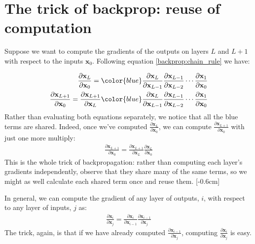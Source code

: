 \section{The trick of backprop: reuse of computation}
Suppose we want to compute the gradients of the outputs on layers $L$ and $L+1$ with respect to the inputs $\mathbf{x}_0$. Following equation \ref{backprop:chain_rule} we have:

\begin{align}
    \frac{\partial \mathbf{x}_{L}}{\partial \mathbf{x}_{0}} =  \color{blue} \frac{\partial \mathbf{x}_{L}}{\partial \mathbf{x}_{L-1}}\frac{\partial \mathbf{x}_{L-1}}{\partial \mathbf{x}_{L-2}} \cdots \frac{\partial \mathbf{x}_{1}}{\partial \mathbf{x}_{0}}\\
    \frac{\partial \mathbf{x}_{L+1}}{\partial \mathbf{x}_{0}} = \frac{\partial \mathbf{x}_{L+1}}{\partial \mathbf{x}_{L}} \color{blue} \frac{\partial \mathbf{x}_{L}}{\partial \mathbf{x}_{L-1}}\frac{\partial \mathbf{x}_{L-1}}{\partial \mathbf{x}_{L-2}} \cdots \frac{\partial \mathbf{x}_{1}}{\partial \mathbf{x}_{0}}
\end{align}
Rather than evaluating both equations separately, we notice that all the blue terms are shared. Indeed, once we've computed $\frac{\partial \mathbf{x}_{L}}{\partial \mathbf{x}_{0}}$, we can compute $\frac{\partial \mathbf{x}_{L+1}}{\partial \mathbf{x}_{0}}$ with just one more multiply:
\begin{align}
    \frac{\partial \mathbf{x}_{L+1}}{\partial \mathbf{x}_{0}} = \frac{\partial \mathbf{x}_{L+1}}{\partial \mathbf{x}_{L}} \frac{\partial \mathbf{x}_{L}}{\partial \mathbf{x}_{0}}
\end{align}
This is the whole trick of backpropagation: rather than computing each layer's gradients independently, observe that they share many of the same terms, so we might as well calculate each shared term once and reuse them. [-0.6cm]

In general, we can compute the gradient of any layer of outputs, $i$, with respect to any layer of inputs, $j$ as:
\begin{align}
    \frac{\partial \mathbf{x}_{i}}{\partial \mathbf{x}_{j}} = \frac{\partial \mathbf{x}_{i}}{\partial \mathbf{x}_{i-1}} \frac{\partial \mathbf{x}_{i-1}}{\partial \mathbf{x}_{j}}\label{eqn:backprop:trick}
\end{align}
The trick, again, is that if we have already computed $\frac{\partial \mathbf{x}_{i-1}}{\partial \mathbf{x}_{j}}$, computing $\frac{\partial \mathbf{x}_{i}}{\partial \mathbf{x}_{j}}$ is easy.

